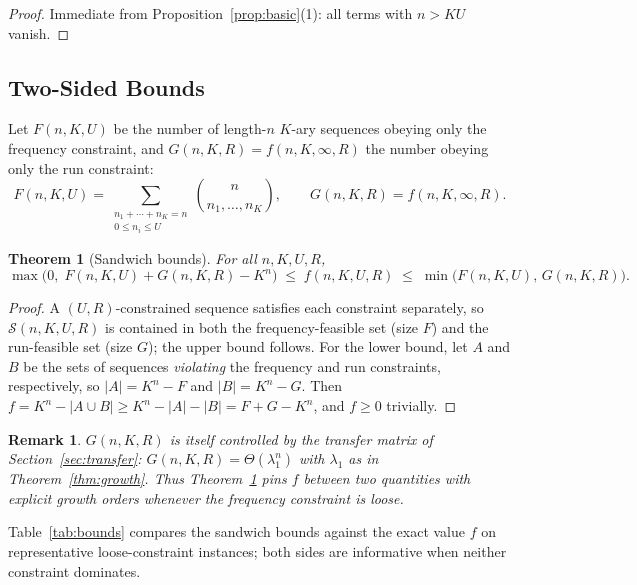 \documentclass[a4paper,12pt]{article}
\newtheorem{theorem}{Theorem}
\newtheorem{remark}{Remark}
\begin{document}
\begin{proof}
Immediate from Proposition~\ref{prop:basic}(1): all terms with $n>KU$
vanish.
\end{proof}

\subsection{Two-Sided Bounds}

Let $F(n,K,U)$ be the number of length-$n$ $K$-ary sequences obeying
only the frequency constraint, and $G(n,K,R)=f(n,K,\infty,R)$ the
number obeying only the run constraint:
\begin{equation}
F(n,K,U)=\!\!\sum_{\substack{n_1+\cdots+n_K=n\\ 0\le n_i\le U}}\!\!
          \binom{n}{n_1,\ldots,n_K},
\qquad
G(n,K,R)=f(n,K,\infty,R).
\end{equation}

\begin{theorem}[Sandwich bounds]\label{thm:sandwich}
For all $n,K,U,R$,
\begin{equation}
\max\bigl(0,\;F(n,K,U)+G(n,K,R)-K^n\bigr)
\;\le\; f(n,K,U,R)\;\le\;
\min\bigl(F(n,K,U),\,G(n,K,R)\bigr).
\end{equation}
\end{theorem}

\begin{proof}
A $(U,R)$-constrained sequence satisfies each constraint separately,
so $\mathcal{S}(n,K,U,R)$ is contained in both the frequency-feasible
set (size $F$) and the run-feasible set (size $G$); the upper bound
follows.  For the lower bound, let $A$ and $B$ be the sets of
sequences \emph{violating} the frequency and run constraints,
respectively, so $|A|=K^n-F$ and $|B|=K^n-G$.  Then
$f=K^n-|A\cup B|\ge K^n-|A|-|B|=F+G-K^n$, and $f\ge 0$ trivially.
\end{proof}

\begin{remark}
$G(n,K,R)$ is itself controlled by the transfer matrix of
Section~\ref{sec:transfer}: $G(n,K,R)=\Theta(\lambda_1^n)$ with
$\lambda_1$ as in Theorem~\ref{thm:growth}.  Thus
Theorem~\ref{thm:sandwich} pins $f$ between two quantities with
explicit growth orders whenever the frequency constraint is loose.
\end{remark}

Table~\ref{tab:bounds} compares the sandwich bounds against the exact
value $f$ on representative loose-constraint instances; both sides are
informative when neither constraint dominates.
\end{document}
